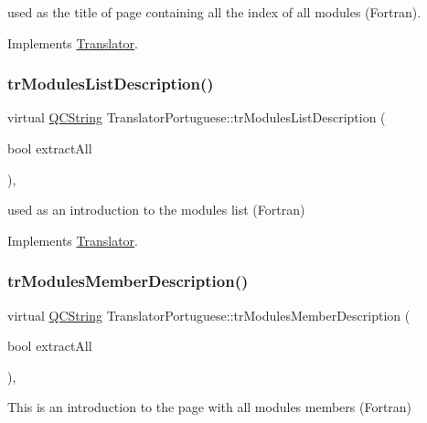 used as the title of page containing all the index of all modules (Fortran). 

Implements \mbox{\hyperlink{class_translator}{Translator}}.

\mbox{\label{class_translator_portuguese_a26f0e8e3e292052ff9893df61d6a1fa3}} 
\subsubsection{\texorpdfstring{trModulesListDescription()}{trModulesListDescription()}}
{\footnotesize\ttfamily virtual \mbox{\hyperlink{class_q_c_string}{Q\+C\+String}} Translator\+Portuguese\+::tr\+Modules\+List\+Description (\begin{DoxyParamCaption}\item[{bool}]{extract\+All }\end{DoxyParamCaption})\hspace{0.3cm}{\ttfamily [inline]}, {\ttfamily [virtual]}}

used as an introduction to the modules list (Fortran) 

Implements \mbox{\hyperlink{class_translator}{Translator}}.

\mbox{\label{class_translator_portuguese_a5a2541ba0a6c3b5e5917ed371c1a9e07}} 
\subsubsection{\texorpdfstring{trModulesMemberDescription()}{trModulesMemberDescription()}}
{\footnotesize\ttfamily virtual \mbox{\hyperlink{class_q_c_string}{Q\+C\+String}} Translator\+Portuguese\+::tr\+Modules\+Member\+Description (\begin{DoxyParamCaption}\item[{bool}]{extract\+All }\end{DoxyParamCaption})\hspace{0.3cm}{\ttfamily [inline]}, {\ttfamily [virtual]}}

This is an introduction to the page with all modules members (Fortran) 

